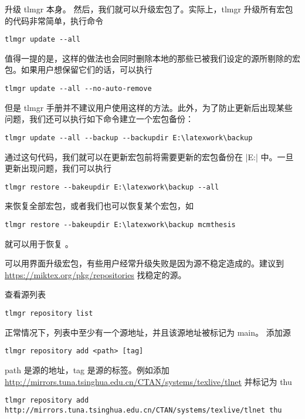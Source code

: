 升级 tlmgr 本身。 然后，我们就可以升级宏包了。实际上，tlmgr
升级所有宏包的代码非常简单，执行命令
\begin{verbatim}
tlmgr update --all
\end{verbatim}

值得一提的是，这样的做法也会同时删除本地的那些已被我们设定的源所剔除的宏包。如果用户想保留它们的话，可以执行

\begin{verbatim}
tlmgr update --all --no-auto-remove
\end{verbatim}

但是 tlmgr
手册并不建议用户使用这样的方法。此外，为了防止更新后出现某些问题，我们还可以执行如下命令建立一个宏包备份：

\begin{verbatim}
tlmgr update --all --backup --backupdir E:\latexwork\backup
\end{verbatim}

通过这句代码，我们就可以在更新宏包前将需要更新的宏包备份在
|E:\latexwork\backup| 中。一旦更新出现问题，我们可以执行

\begin{verbatim}
tlmgr restore --bakeupdir E:\latexwork\backup --all
\end{verbatim}

来恢复全部宏包，或者我们也可以恢复某个宏包，如

\begin{verbatim}
tlmgr restore --bakeupdir E:\latexwork\backup mcmthesis
\end{verbatim}

就可以用于恢复 。



\MiKTeX{}
可以用界面升级宏包，有些用户经常升级失败是因为源不稳定造成的。建议到
\url{https://miktex.org/pkg/repositories} 找稳定的源。



查看源列表
\begin{verbatim}
tlmgr repository list
\end{verbatim}

正常情况下，列表中至少有一个源地址，并且该源地址被标记为 main。 添加源
\begin{verbatim}
tlmgr repository add <path> [tag]
\end{verbatim}

path 是源的地址，tag 是源的标签。例如添加
\url{http://mirrors.tuna.tsinghua.edu.cn/CTAN/systems/texlive/tlnet} 并标记为 thu
\begin{verbatim}
tlmgr repository add http://mirrors.tuna.tsinghua.edu.cn/CTAN/systems/texlive/tlnet thu
\end{verbatim}

